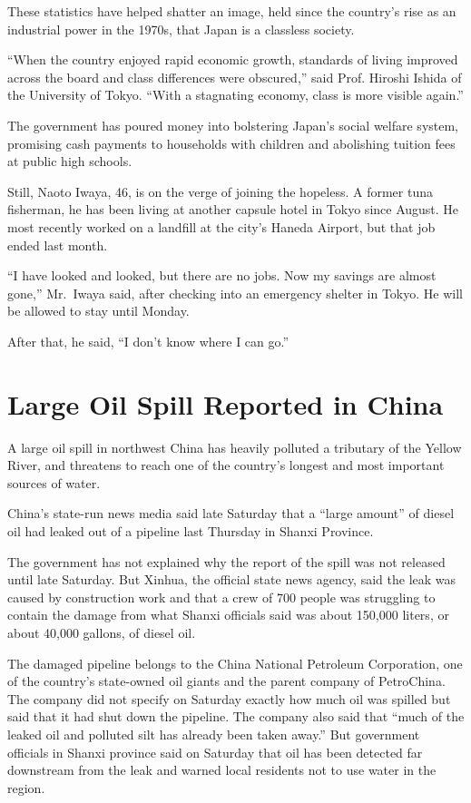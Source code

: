 ﻿\documentclass[12pt]{article}
\begin{document}
These statistics have helped shatter an image, held since the country's rise as an industrial power
in the 1970s, that Japan is a classless society.

``When the country enjoyed rapid economic growth, standards of living improved across the board and
class differences were obscured,'' said Prof. Hiroshi Ishida of the University of Tokyo. ``With a
stagnating economy, class is more visible again.''

The government has poured money into bolstering Japan's social welfare system, promising cash
payments to households with children and abolishing tuition fees at public high schools.

Still, Naoto Iwaya, 46, is on the verge of joining the hopeless. A former tuna fisherman, he has
been living at another capsule hotel in Tokyo since August. He most recently worked on a landfill at
the city's Haneda Airport, but that job ended last month.

``I have looked and looked, but there are no jobs. Now my savings are almost gone,'' Mr.~Iwaya said,
after checking into an emergency shelter in Tokyo. He will be allowed to stay until Monday.

After that, he said, ``I don't know where I can go.''

\section{Large Oil Spill Reported in China}

\lettrine{A}{} large oil spill in northwest China has heavily polluted a
tributary of the Yellow River, and threatens to reach one of the country's longest and most
important sources of water.

China's state-run news media said late Saturday that a ``large amount'' of diesel oil had leaked out
of a pipeline last Thursday in Shanxi Province.

The government has not explained why the report of the spill was not released until late Saturday.
But Xinhua, the official state news agency, said the leak was caused by construction work and that a
crew of 700 people was struggling to contain the damage from what Shanxi officials said was about
150,000 liters, or about 40,000 gallons, of diesel oil.

The damaged pipeline belongs to the China National Petroleum Corporation, one of the country's
state-owned oil giants and the parent company of PetroChina. The company did not specify on Saturday
exactly how much oil was spilled but said that it had shut down the pipeline. The company also said
that ``much of the leaked oil and polluted silt has already been taken away.'' But government
officials in Shanxi province said on Saturday that oil has been detected far downstream from the
leak and warned local residents not to use water in the region.
\end{document}
